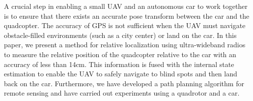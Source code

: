 A crucial step in enabling a small UAV and an autonomous car to work
together is to ensure that there exists an accurate pose transform between the car
and the quadcopter. The accuracy of GPS is not sufficient when the UAV must navigate
obstacle-filled environments (such as a city center) or land on the car. In
this paper, we present a method for relative localization using ultra-wideband
radios to measure the relative position of the quadcopter relative to the car
with an accuracy of less than 14cm. This information is fused with the internal
state estimation to enable the UAV to safely navigate to blind spots and then
land back on the car. Furthermore, we have developed a path planning algorithm
for remote sensing and have carried out experiments using a quadrotor and a
car.



